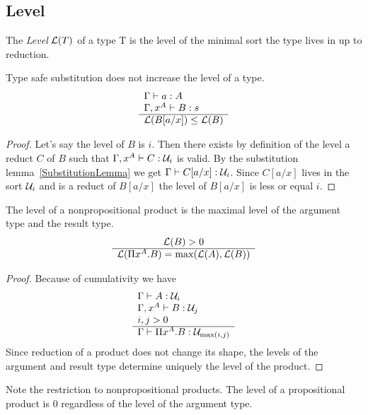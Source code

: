 \subsection{Level}


\begin{definition}
    The \emph{Level} ${\cal L}(T)$ of a type T is the level of the minimal sort
    the type lives in up to reduction.
\end{definition}


\begin{theorem}
    \label{thm:LevelTypeSafeSubstitution}
    Type safe substitution does not increase the level of a type.
    $$
    \begin{array}{l} 
        \Gamma \vdash a : A
        \\
        \Gamma, x^A \vdash B: s
     \\ \hline 
        {\cal L}(B[a/x]) \le {\cal L}(B)
    \end{array}
    $$
    \begin{proof}
        Let's say the level of $B$ is $i$. Then there exists by definition of
        the level a reduct $C$ of $B$ such that $\Gamma, x^A \vdash C: {\cal U}_i$
        is valid. By the substitution lemma~\ref{SubstitutionLemma} we get
        $\Gamma \vdash C[a/x]: {\cal U}_i$. Since $C[a/x]$ lives in the sort
        ${\cal U}_i$ and is a reduct of $B[a/x]$ the level of $B[a/x]$ is less or
        equal $i$.
    \end{proof}
\end{theorem}




\begin{theorem}
    \label{thm:LevelProduct}
    The level of a nonpropositional product is the maximal level of the argument
    type and the result type.
    $$
    \begin{array}{c} 
        {\cal L}(B) > 0
     \\ \hline 
        {\cal L}(\Pi x^A.B) = {\text{max}}({\cal L}(A), {\cal L}(B))
    \end{array}
    $$
    \begin{proof}
        Because of cumulativity we have
        $$
        \begin{array}{l} 
            \Gamma \vdash A: {\cal U}_i
            \\
            \Gamma,x^A \vdash B: {\cal U}_j
            \\
            i,j > 0
         \\ \hline 
            \Gamma \vdash \Pi x^A. B : {\cal U}_{{\text{max}}(i,j)}
        \end{array}
        $$
        Since reduction of a product does not change its shape, the levels of
        the argument and result type determine uniquely the level of the
        product.
    \end{proof}

    Note the restriction to nonpropositional products. The level of a
    propositional product is 0 regardless of the level of the argument type.
\end{theorem}




